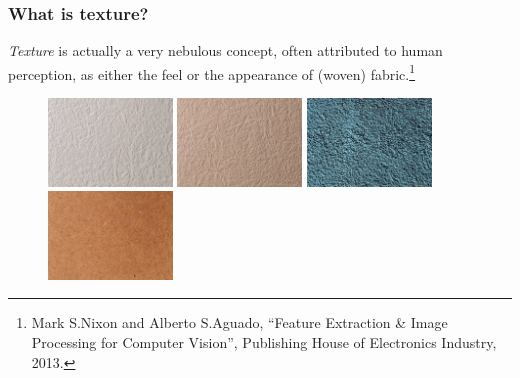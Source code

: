 \documentclass[notheorems,serif,table,compress]{beamer}  %
\begin{document}
\begin{frame}
\frametitle{What is texture?}
{\color{blue}\emph{Texture}} is actually a very nebulous concept, often attributed to human perception, as either the feel or the appearance of (woven) fabric.\footnote{Mark S.Nixon and Alberto S.Aguado, ``Feature Extraction \& Image Processing for Computer Vision'', Publishing House of Electronics Industry, 2013.}
\begin{figure}[!ht]
  \begin{minipage}[t]{0.35\textwidth}
  \includegraphics[width=1.3in]{texture1.jpg}
  \end{minipage}
  \begin{minipage}[t]{0.35\textwidth}
  \includegraphics[width=1.3in]{texture2.jpg}
  \end{minipage}
  \begin{minipage}[t]{0.35\textwidth}
  \includegraphics[width=1.3in]{texture3.jpg}
  \end{minipage}
  \begin{minipage}[t]{0.35\textwidth}
  \includegraphics[width=1.3in]{texture4.jpg}
  \end{minipage}
  \end{figure} 
\end{frame}

%
\end{document}
